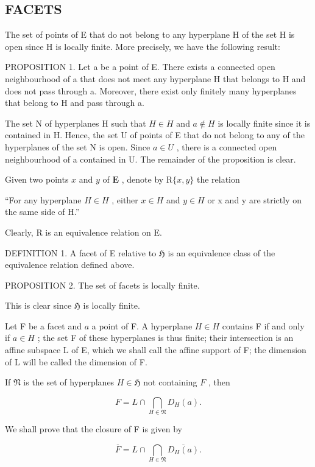 \subsection{FACETS}

The set of points of E that do not belong to any hyperplane H of the set H is open since H is locally finite. More precisely, we have the following result:

PROPOSITION 1. Let a be a point of E. There exists a connected open neighbourhood of a that does not meet any hyperplane H that belongs to H and does not pass through a. Moreover, there exist only finitely many hyperplanes that belong to H and pass through a.

The set N of hyperplanes H such that \(H \in H\) and \(a \notin H\) is locally finite since it is contained in H. Hence, the set U of points of E that do not belong to any of the hyperplanes of the set N is open. Since \(a \in U\) , there is a connected open neighbourhood of a contained in U. The remainder of the proposition is clear.

Given two points \(x\) and \(y\) of \(\mathbf{E}\) , denote by \(\mathrm{R}\{x,y\}\) the relation

``For any hyperplane \(H \in H\) , either \(x \in H\) and \(y \in H\) or x and y are strictly on the same side of H.''

Clearly, R is an equivalence relation on E.

DEFINITION 1. A facet of E relative to \(\mathfrak{H}\) is an equivalence class of the equivalence relation defined above.

PROPOSITION 2. The set of facets is locally finite.

This is clear since \(\mathfrak{H}\) is locally finite.

Let F be a facet and \(a\) a point of F. A hyperplane \(H \in H\) contains F if and only if \(a \in H\) ; the set F of these hyperplanes is thus finite; their intersection is an affine subspace L of E, which we shall call the affine support of F; the dimension of L will be called the dimension of F.

If \(\mathfrak{N}\) is the set of hyperplanes \(H\in \mathfrak{H}\) not containing \(F\) , then

\[
F = L \cap \bigcap_ {H \in \mathfrak {N}} D _ {H} (a).\tag{2}
\]

We shall prove that the closure of F is given by

\[
\overline {{F}} = L \cap \bigcap_ {H \in \mathfrak {N}} \overline {{D _ {H} (a)}}.\tag{3}
\]

